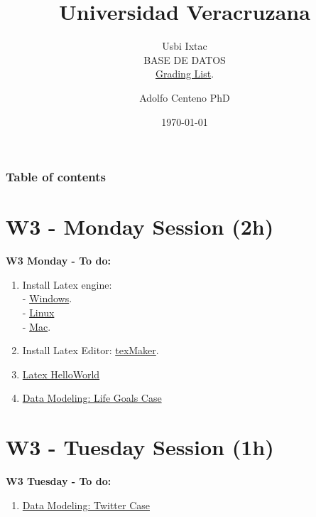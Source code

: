 \documentclass{beamer}
\begin{document}
\title{Universidad Veracruzana}  
\subtitle{Usbi Ixtac\\BASE DE DATOS\\\href{https://drive.google.com/file/d/1sRWbepky4p5Bc_nAl7CCng5kKv3uSU7w/view?usp=sharing}{Grading List}.
}
\author{Adolfo Centeno PhD}
\date{\today} 


\begin{frame}
\titlepage
\end{frame}

\begin{frame}\frametitle{Table of contents}
\tableofcontents
\end{frame} 


\section{W3 - Monday Session (2h) }

\begin{frame}

\textbf{W3 Monday - To do:}

\begin{enumerate}
\item
    Install Latex engine:  \\
    - \href{https://miktex.org/download}{Windows}. \\
    - \href{https://dzone.com/articles/installing-latex-ubuntu}{Linux} \\
    - \href{http://www.tug.org/mactex/mactex-download.html}{Mac}. 
\item
	Install Latex Editor: \href{https://www.xm1math.net/texmaker/download.html}{texMaker}.	
\item
	\href{https://github.com/adsoftsito/tdd/blob/master/w3/helloworld.tex}{Latex HelloWorld} 
\item
	\href{https://github.com/adsoftsito/database2020/blob/master/w3/datamodel_lifegoals.tex}{Data Modeling: Life Goals Case} 
	 

	

\end{enumerate} 

\end{frame}


\section{W3 - Tuesday Session (1h) }

\begin{frame}

\textbf{W3 Tuesday - To do:}

\begin{enumerate}
\item
	\href{https://github.com/adsoftsito/tdd/blob/master/w3/helloworld.tex}{Data Modeling: Twitter Case} 


\end{enumerate} 

\end{frame}
\end{document}
